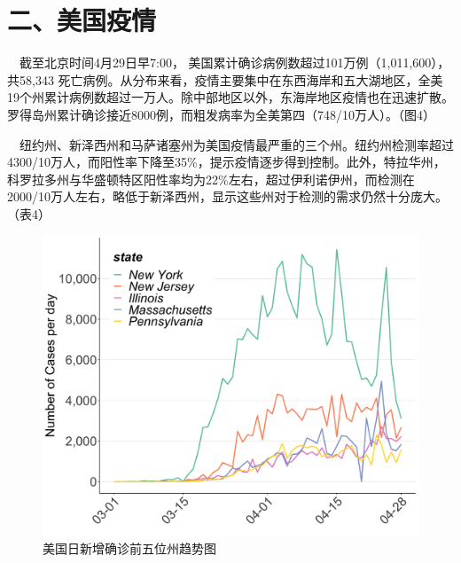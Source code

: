 \documentclass[
]{article}
\begin{document}
\hypertarget{section-3}{%
\section{\texorpdfstring{\textcolor{glaucous}{\Huge 二、美国疫情}}{}}\label{section-3}}

\vspace{-5mm}

\(\quad\)截至北京时间4月29日早7:00，
美国累计确诊病例数超过101万例（1,011,600），共58,343
死亡病例。从分布来看，疫情主要集中在东西海岸和五大湖地区，全美19个州累计病例数超过一万人。除中部地区以外，东海岸地区疫情也在迅速扩散。罗得岛州累计确诊接近8000例，而粗发病率为全美第四（748/10万人）。（图4）

\(\quad\)纽约州、新泽西州和马萨诸塞州为美国疫情最严重的三个州。纽约州检测率超过4300/10万人，而阳性率下降至35\%，提示疫情逐步得到控制。此外，特拉华州，科罗拉多州与华盛顿特区阳性率均为22\%左右，超过伊利诺伊州，而检测在2000/10万人左右，略低于新泽西州，显示这些州对于检测的需求仍然十分庞大。（表4）

\begin{figure}[H]
\centering
{}
\caption{美国日新增确诊前五位州趋势图}
\includegraphics[]{./input/covid5.png}
\end{figure}
\end{document}
